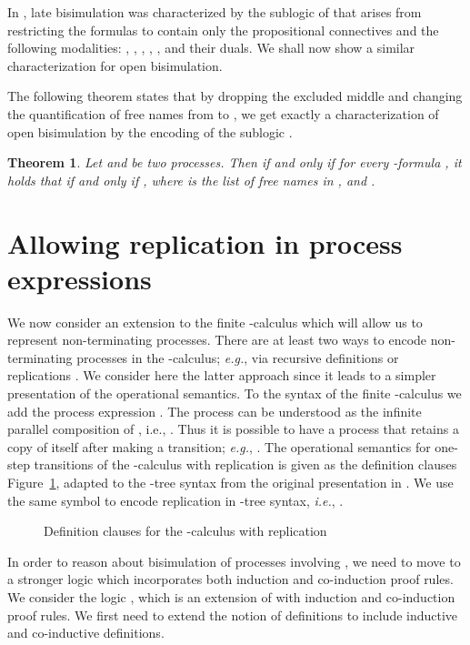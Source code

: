 \documentclass{acmtrans2m}
\newtheorem{theorem}{Theorem}
\begin{document}
In \cite{milner93tcs}, late bisimulation was characterized by the
sublogic  of  that arises from restricting the
formulas to contain only the propositional connectives and the
following modalities: , , , , , and their duals.  We shall now show a similar 
characterization for open bisimulation.

The following theorem states that by dropping the excluded middle and
changing the quantification of free names from  to ,
we get exactly a characterization of open bisimulation by the encoding
of the sublogic .

\begin{theorem}
\label{thm:ch-open}
Let  and  be two processes.
Then  if and only if
for every -formula ,
it holds that 
if and only if 
,
where  is the list of free names in ,  and .
\end{theorem}


\section{Allowing replication in process expressions}
\label{sec:pi rep}


We now consider an extension to the finite -calculus which will allow
us to represent non-terminating processes. 
There are at least two ways to encode non-terminating processes in the
-calculus; {\em e.g.}, via recursive definitions or
replications \cite{sangiorgi01}. We consider here the latter approach since it leads to
a simpler presentation of the operational semantics. 
To the syntax of the finite -calculus we add the process expression
. The process  can be understood as the infinite
parallel composition of , i.e., .
Thus it is possible to have a process 
that retains a copy of itself after making a transition;
{\em e.g.}, . The operational semantics for one-step
transitions of the -calculus with replication 
is given as the definition clauses Figure~\ref{fig:rep-pi def}, 
adapted to the -tree syntax from the original presentation in \cite{sangiorgi01}. 
We use the same symbol to encode replication in -tree syntax,
{\em i.e.}, .

\begin{figure}

\caption{Definition clauses for the -calculus with replication}
\label{fig:rep-pi def}
\end{figure}

In order to reason about bisimulation of processes involving , we need to move
to a stronger logic which incorporates both induction and co-induction
proof rules. We consider the logic  \cite{tiu04phd}, which is an extension of
 with induction and co-induction proof rules. 
We first need to extend the notion of definitions to include inductive
and co-inductive definitions. 
\end{document}
